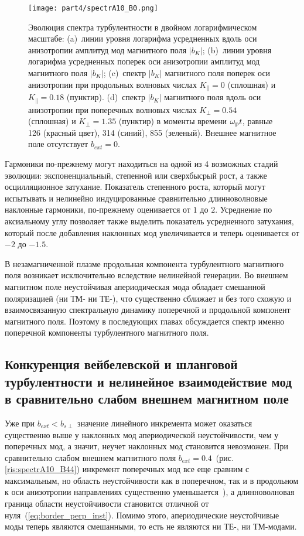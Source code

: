 \begin{figure}[h] 
\texttt{[image: part4/spectrA10\_B0.png]}
\caption{Эволюция спектра турбулентности в двойном логарифмическом масштабе: (a)~линии уровня логарифма усредненных вдоль оси анизотропии амплитуд мод магнитного поля $|b_K|$; 
(b)~линии уровня логарифма усредненных поперек оси анизотропии амплитуд мод магнитного поля $|b_K|$; 
(c)~спектр $|b_K|$ магнитного поля поперек оси анизотропии при продольных волновых числах $K_\|=0$ (сплошная) и $K_\|=0.18$ (пунктир). 
(d)~спектр $|b_K|$ магнитного поля вдоль оси анизотропии при поперечных волновых числах $K_\perp=0.54$ (сплошная) и $K_\perp=1.35$ (пунктир) в моменты времени $\omega_\mathrm{p} t$, равные 126 (красный цвет), 314 (синий), 855 (зеленый). Внешнее магнитное поле отсутствует $b_{ext}=0$.
}
\label{ris:spectrA10_B0}
\end{figure}

Гармоники по-прежнему могут находиться на одной из 4 возможных стадий эволюции: экспоненциальный, степенной или сверхбысрый рост, а также осцилляционное затухание. Показатель степенного роста, который могут испытывать и нелинейно индуцированные сравнительно длинноволновые наклонные гармоники, по-прежнему оценивается от $1$ до $2$. Усреднение по аксиальному углу позволяет также выделить показатель усредненного затухания, который после добавления наклонных мод увеличивается и теперь оценивается от $-2$ до $-1.5$.  

В незамагниченной плазме продольная компонента турбулентного магнитного поля возникает исключительно вследствие нелинейной генерации. Во внешнем магнитном поле неустойчивая апериодическая мода обладает смешанной поляризацией (ни ТМ- ни ТЕ-), что существенно сближает и без того схожую и взаимосвязанную спектральную динамику поперечной и продольной компонент магнитного поля. Поэтому в последующих главах обсуждается спектр именно поперечной компоненты турбулентного магнитного поля. 


\subsection{Конкуренция вейбелевской и шланговой турбулентности и нелинейное взаимодействие мод в сравнительно слабом внешнем магнитном поле}
\label{part_spectr_b4}
Уже при $b_{ext}< b_{s\perp}$ значение линейного инкремента может оказаться существенно выше у наклонных мод апериодической неустойчивости, чем у поперечных мод, а значит, неучет наклонных мод становится невозможен. При сравнительно слабом внешнем магнитного поля $b_{ext}=0.4$~(рис. \ref{ris:spectrA10_B44}) инкремент поперечных мод все еще сравним с максимальным, но область неустойчивости как в поперечном, так и в продольном к оси анизотропии направлениях существенно уменьшается~\cite{Emelyanov2023_Radiophys,Moya2022}), а длинноволновая граница области неустойчивости становится отличной от нуля~(\ref{eq:border_perp_inst}). Помимо этого, апериодические неустойчивые моды теперь являются смешанными, то есть не являются ни ТЕ-, ни ТМ-модами. 



